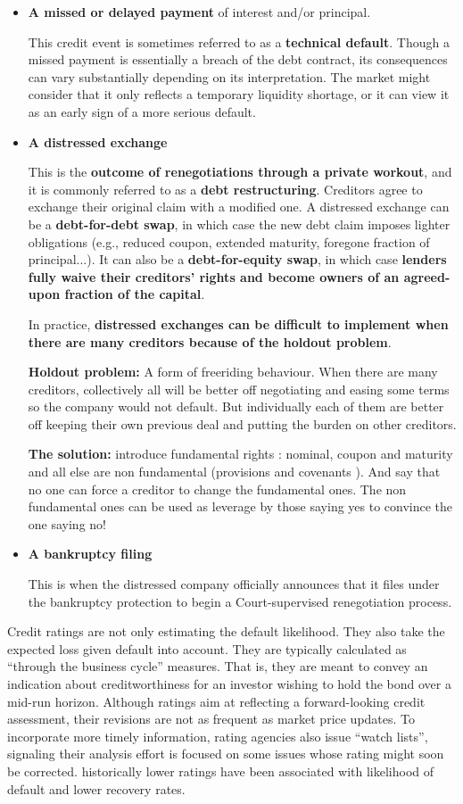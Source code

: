 \documentclass[12pt,a4paper]{article}
\begin{document}
\begin{itemize}
\item \textbf{A missed or delayed payment} of interest and/or principal.

This credit event is sometimes referred to as a \textbf{technical default}. Though a missed payment is essentially a breach of the debt contract, its consequences can vary substantially depending on its interpretation. The market might consider that it only reflects a temporary liquidity shortage, or it can view it as an early sign of a more serious default.

\item \textbf{A distressed exchange}

This is the \textbf{outcome of renegotiations through a private workout}, and it is commonly referred to as a \textbf{debt restructuring}. Creditors agree to exchange their original claim with a modified one. A distressed exchange can be a \textbf{debt-for-debt swap}, in which case the new debt claim imposes lighter obligations (e.g., reduced coupon, extended maturity, foregone fraction of principal...). It can also be a \textbf{debt-for-equity swap}, in which case \textbf{lenders fully waive their creditors' rights and become owners of an agreed-upon fraction of the capital}.

In practice, \textbf{distressed exchanges can be difficult to implement when there are many creditors because of the holdout problem}.

\textbf{Holdout problem:} A form of freeriding behaviour. When there are many creditors, collectively all will be better off negotiating and easing some terms so the company would not default. But individually each of them are better off keeping their own previous deal and putting the burden on other creditors.

\textbf{The solution:} introduce fundamental rights : nominal, coupon and  maturity and all else are non fundamental (provisions and covenants ). And say that no one can force a creditor to change the fundamental ones. The non fundamental ones can be used as leverage by those saying yes to convince the one saying no!

\item \textbf{A bankruptcy filing}

This is when the distressed company officially announces that it files under the bankruptcy protection to begin a Court-supervised renegotiation process.
\end{itemize}
Credit ratings are not only estimating the default likelihood. They also take the expected loss given 
default into account. They are typically calculated as “through the business cycle” measures. That 
is, they are meant to convey an indication about creditworthiness for an investor wishing to hold 
the bond over a mid-run horizon. Although ratings aim at reflecting a forward-looking credit 
assessment, their revisions are not as frequent as market price updates. To incorporate more 
timely information, rating agencies also issue “watch lists”, signaling their analysis effort is focused 
on some issues whose rating might soon be corrected. historically lower ratings have been associated with likelihood of default and lower recovery rates. 
\end{document}
